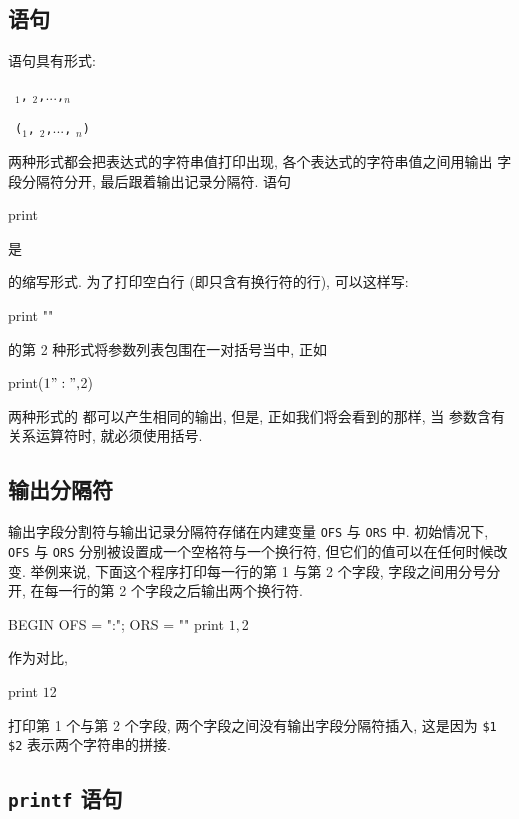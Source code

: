 \subsection{\textbf{\print} 语句}
\label{subsec:the_print_statement}
\print 语句具有形式:
\begin{pattern}
    \print\ \expr$_1$\verb',' \expr$_2$\verb','...\verb','\expr$_n$ \par
    \print\ \verb'('\expr$_1$\verb',' \expr$_2$\verb','...\verb','
    \expr$_n$\verb')'
\end{pattern}
两种形式都会把表达式的字符串值打印出现, 各个表达式的字符串值之间用输出
字段分隔符分开, 最后跟着输出记录分隔符. 语句
\begin{myverb}
    print
\end{myverb}
是
的缩写形式. 为了打印空白行 (即只含有换行符的行), 可以这样写:
\begin{myverb}
    print ""
\end{myverb}
\print 的第 2 种形式将参数列表包围在一对括号当中, 正如
\begin{myverb}
    print($1 ":", $2)
\end{myverb}
两种形式的 \print 都可以产生相同的输出, 但是, 正如我们将会看到的那样, 当
参数含有关系运算符时, 就必须使用括号.

\subsection{输出分隔符}
\label{subsec:output_separators}

输出字段分割符与输出记录分隔符存储在内建变量 \verb'OFS' 与 \verb'ORS' 中.
初始情况下, \verb'OFS' 与 \verb'ORS' 分别被设置成一个空格符与一个换行符,
但它们的值可以在任何时候改变. 举例来说, 下面这个程序打印每一行的第 1 与第
2 个字段, 字段之间用分号分开, 在每一行的第 2 个字段之后输出两个换行符.
\begin{myverb}
    BEGIN   { OFS = ":"; ORS = "\n\n" }
            { print $1, $2 }
\end{myverb}
作为对比,
\begin{myverb}
    { print $1 $2 }
\end{myverb}
打印第 1 个与第 2 个字段, 两个字段之间没有输出字段分隔符插入, 这是因为
\verb'$1 $2' 表示两个字符串的拼接.

\subsection{\textbf{\texttt{printf}} 语句}
\label{subsec:the_printf_statement}

